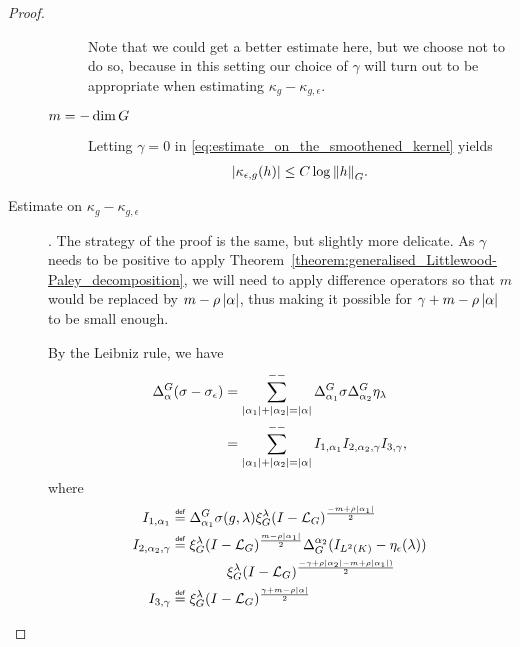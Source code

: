 \begin{proof}
\begin{description}
\begin{description}
                    Note that we could get a better estimate here,
                    but we choose not to do so,
                    because in this setting our choice of $\gamma$ will turn out to be appropriate when estimating $\kappa_g - \kappa_{g, \epsilon}$.
                \item[$m = -\dim \Group$]
                    Letting $\gamma = 0$ in \eqref{eq:estimate_on_the_smoothened_kernel} yields
                    \begin{align*}
                        \abs {\kappa_{\epsilon, g}(h)}
                        \leq C \log \norm [\Group] h.
                    \end{align*}
            \end{description}

        \item[Estimate on $\kappa_g - \kappa_{g, \epsilon}$].
            The strategy of the proof is the same,
            but slightly more delicate.
            As $\gamma$ needs to be positive to apply Theorem~\ref{theorem:generalised_Littlewood-Paley_decomposition},
            we will need to apply difference operators so that $m$ would be replaced by $m - \rho \abs \alpha$,
            thus making it possible for $\gamma + m - \rho \abs \alpha$ to be small enough.

            By the Leibniz rule,
            we have
            \begin{align*}
                \DifferenceOperator \alpha (\sigma - \sigma_\epsilon)
                &= \lcsum{\abs {\alpha_1} + \abs {\alpha_2} = \abs \alpha}
                \DifferenceOperator {\alpha_1} \sigma \DifferenceOperator {\alpha_2} \eta_\lambda\\
                &= \lcsum{\abs {\alpha_1} + \abs {\alpha_2} = \abs \alpha}
                I_{1, \alpha_1} I_{2, \alpha_2, \gamma} I_{3, \gamma},
            \end{align*}
            where
            \begin{align*}
                I_{1, \alpha_1} &\defeq \DifferenceOperator {\alpha_1} \sigma(g, \lambda) \Rep \lambda \BesselPotential {-m + \rho \abs {\alpha_1}}\\
                I_{2, \alpha_2, \gamma} &\defeq \Rep \lambda \BesselPotential {m - \rho \abs {\alpha_1}} \DifferenceOperatorOrder {\alpha_2} (\Id {\Lebesgue 2 \CompactGroup} - \eta_\epsilon(\lambda))\\
                &\qquad \qquad\Rep \lambda \BesselPotential {-\gamma + \rho \abs {\alpha_2} - m + \rho \abs {\alpha_1})}\\
                I_{3, \gamma} &\defeq \Rep \lambda \BesselPotential {\gamma + m - \rho \abs \alpha}
            \end{align*}


\end{description}
\end{proof}
